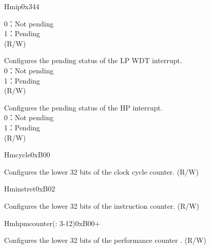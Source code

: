 \begin{register}{H}{mip}{0x344}
\begin{regdesc}
\begin{reglist}
0：Not pending\\
1：Pending \\(R/W)
\label{fielddesc:LPMIPWDTIP}\item [LP\_WDT\_IP] Configures the pending status of the LP WDT interrupt.\\
0：Not pending\\
1：Pending \\(R/W)
\label{fielddesc:LPMIPHPIP}\item [HP\_IP] Configures the pending status of the HP interrupt.\\
0：Not pending\\
1：Pending \\(R/W)
\end{reglist}\end{regdesc}
\end{register}

\begin{register}{H}{mcycle}{0xB00}\label{regdesc:LPMCYCLE}
%
\regnewline%
\begin{regdesc}\begin{reglist}
\label{fielddesc:LPMCYCLE}\item [MCYCLE] Configures the lower 32 bits of the clock cycle counter. (R/W)
\end{reglist}\end{regdesc}
\end{register}

\begin{register}{H}{minstret}{0xB02}\label{regdesc:LPMINSTRET}
%
\regnewline%
\begin{regdesc}\begin{reglist}
\label{fielddesc:LPMINSTRET}\item [MINSTRET] Configures the lower 32 bits of the instruction counter. (R/W)
\end{reglist}\end{regdesc}
\end{register}


\begin{register}{H}{mhpmcounter(: 3-12)}{0xB00+}\label{regdesc:LPMHPMCOUNTER}
%
\regnewline%
\begin{regdesc}\begin{reglist}
\label{fielddesc:LPMHMPCOUNTER}\item [MHPMCOUNTER\regindex{n}] Configures the lower 32 bits of the performance counter . (R/W)
\end{reglist}\end{regdesc}
\end{register}


